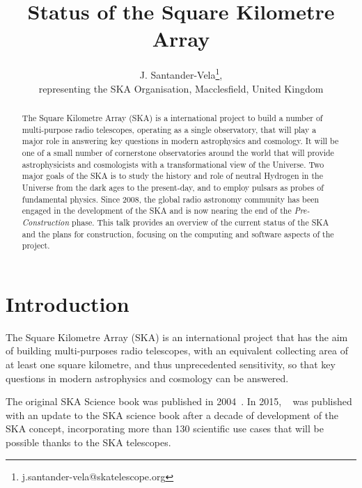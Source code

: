 \documentclass[a4paper,
               biblatex,       %
               keeplastbox,    %
               ]{jacow-2_1}    %
\begin{document}
\title{Status of the Square Kilometre Array}

\author{
	J. Santander-Vela\thanks{j.santander-vela@skatelescope.org},\\
	representing the SKA Organisation, Macclesfield, United Kingdom
}
	
\maketitle

\begin{abstract}
	The Square Kilometre Array (SKA) is a international project to build a number of multi-purpose radio telescopes, operating as a single observatory, that will play a major role in answering key questions in modern astrophysics and cosmology. It will be one of a small number of cornerstone observatories around the world that will provide astrophysicists and cosmologists with a transformational view of the Universe. Two major goals of the SKA is to study the history and role of neutral Hydrogen in the Universe from the dark ages to the present-day, and to employ pulsars as probes of fundamental physics. Since 2008, the global radio astronomy community has been engaged in the development of the SKA and is now nearing the end of the \emph{Pre-Construction} phase. This talk provides an overview of the current status of the SKA and the plans for construction, focusing on the computing and software aspects of the project.
\end{abstract}


\section{Introduction} %
\label{sec:introduction}
The Square Kilometre Array (SKA) is an international project that has the aim of building multi-purposes radio telescopes, with an equivalent collecting area of at least one square kilometre, and thus unprecedented sensitivity, so that key questions in modern astrophysics and cosmology can be answered.

The original SKA Science book was published in 2004~\cite{2004NewAR..48..979C}. In 2015, ~\cite{2015aska.confE.....} was published with an update to the SKA science book after a decade of development of the SKA concept, incorporating more than 130 scientific use cases that will be possible thanks to the SKA telescopes.
\end{document}
